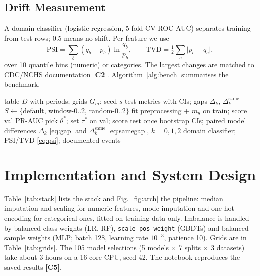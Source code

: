 \documentclass[journal,twoside,web]{ieeecolor}
\DeclareRobustCommand{\contrib}[1]{\textbf{\textcolor{contribframe}{[C#1]}}}
\newcommand{\Dgap}{\ensuremath{\Delta}}
\begin{document}
\subsection{Drift Measurement}
A domain classifier \cite{rabanser2019failing} (logistic regression, 5-fold CV ROC-AUC) separates
training from test rows; 0.5 means no shift. Per feature we use
\begin{equation}
\mathrm{PSI}=\textstyle\sum_b(q_b-p_b)\ln\frac{q_b}{p_b},\qquad \mathrm{TVD}=\tfrac12\sum_c\lvert p_c-q_c\rvert,
\label{eq:psi}
\end{equation}
over 10 quantile bins (numeric) \cite{siddiqi2006credit} or categories. The largest changes are
matched to CDC/NCHS documentation \cite{nhanesdoc} \contrib{2}. Algorithm~\ref{alg:bench}
summarises the benchmark.

\begin{algorithm}[!t]
\caption{Clinical TabReD benchmark for one dataset.}\label{alg:bench}
\begin{algorithmic}[1]
\REQUIRE table $D$ with periods; grids $G_m$; seed $s$
\ENSURE test metrics with CIs; gaps $\Dgap_k$, $\Dgap^{\mathrm{same}}_k$
\STATE $S\gets\{$default, window-0..2, random-0..2$\}$
    \STATE fit preprocessing + $m_\theta$ on train; score val PR-AUC
  \ENDFOR
  \STATE pick $\theta^\ast$; set $\tau^\ast$ on val; score test once
\ENDFOR
\STATE bootstrap CIs; paired model differences
\STATE $\Dgap_k$ \eqref{eq:gap} and $\Dgap^{\mathrm{same}}_k$ \eqref{eq:samegap}, $k=0,1,2$
\STATE domain classifier; PSI/TVD \eqref{eq:psi}; documented events
\end{algorithmic}
\end{algorithm}

\section{Implementation and System Design}
\label{sec:impl}
Table~\ref{tab:stack} lists the stack \cite{pedregosa2011scikit,hunter2007matplotlib} and
Fig.~\ref{fig:arch} the pipeline: median imputation and scaling for numeric features, mode
imputation and one-hot encoding for categorical ones, fitted on training data only. Imbalance is
handled by balanced class weights (LR, RF), \texttt{scale\_pos\_weight} (GBDTs) and balanced sample
weights (MLP; batch 128, learning rate $10^{-3}$, patience 10). Grids are in Table~\ref{tab:grids}.
The 105 model selections (5 models $\times$ 7 splits $\times$ 3 datasets) take about 3 hours on a
16-core CPU, seed 42. The notebook reproduces the saved results \contrib{5}.
\end{document}

